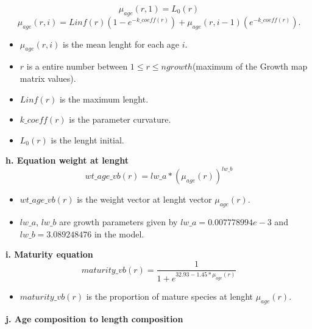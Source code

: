 \documentclass{article}
\begin{document}
\begin{equation}
    \mu_{age}(r,1)=L_0(r)
\end{equation}
\begin{equation}
    \mu_{age}(r,i)=Linf(r)(1-e^{-{k\_coeff(r)}})+\mu_{age}(r,i-1)(e^{-k\_{coeff(r)}}).
\end{equation}
 \begin{itemize}
    \item $\mu_{age}(r,i)$ is the mean lenght for each age $i$.
     \item $r$ is a entire number between $1\leq r \leq ngrowth$(maximum of the Growth map matrix values). 
     \item $Linf(r)$ is the maximum lenght.
     \item $k\_coeff(r)$ is the parameter curvature.
     \item $L_0(r)$ is the lenght initial.
     
 \end{itemize}

\hfill

\textbf{h. Equation weight at lenght}\\
\begin{equation}
     wt\_age\_vb(r) = lw\_a * \left(\mu_{age}(r)\right)^{lw\_b}
 \end{equation}
 \begin{itemize}
     \item $wt\_age\_vb(r)$ is the weight vector at lenght vector $\mu_{age}(r)$.
     \item $lw\_a$, $lw\_b$ are growth parameters given by  $lw\_a=0.007778994e-3$ and $lw\_b=3.089248476$ in the model.
 \end{itemize}

\hfill

\textbf{i. Maturity equation}\\
 \begin{equation}
    maturity\_vb(r) = \dfrac{1}{1+e^{32.93-1.45*\mu_{age}(r)}}
\end{equation}
\begin{itemize}
    \item $maturity\_vb(r)$ is the proportion of mature species at lenght $\mu_{age}(r)$.
\end{itemize}

\hfill

\textbf{j. Age composition to length composition}\\
\end{document}
